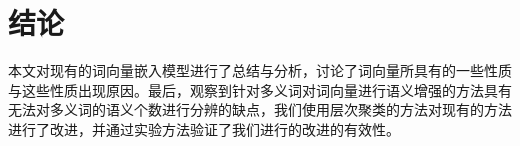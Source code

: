 \iffalse



\fi

\chapter{结论}

本文对现有的词向量嵌入模型进行了总结与分析，讨论了词向量所具有的一些性质与这些性质出现原因。最后，观察到针对多义词对词向量进行语义增强的方法具有无法对多义词的语义个数进行分辨的缺点，我们使用层次聚类的方法对现有的方法进行了改进，并通过实验方法验证了我们进行的改进的有效性。